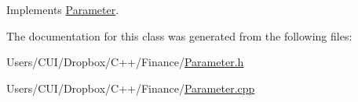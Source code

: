Implements \hyperlink{class_parameter_ae6317fac3d0b5e69101eb7059d151ca7}{Parameter}.



The documentation for this class was generated from the following files\+:\begin{DoxyCompactItemize}
\item 
Users/\+C\+U\+I/\+Dropbox/\+C++/\+Finance/\hyperlink{_parameter_8h}{Parameter.\+h}\item 
Users/\+C\+U\+I/\+Dropbox/\+C++/\+Finance/\hyperlink{_parameter_8cpp}{Parameter.\+cpp}\end{DoxyCompactItemize}
